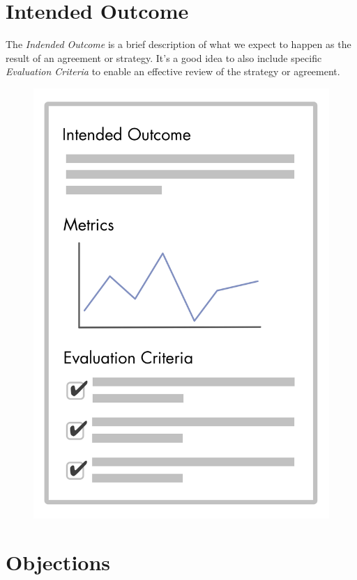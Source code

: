 \section{Intended Outcome}
\label{intendedoutcome}

The \emph{Indended Outcome} is a brief description of what we expect to happen as the result of an agreement or strategy. It's a good idea to also include specific \emph{Evaluation Criteria} to enable an effective review of the strategy or agreement.

\begin{figure}[htbp]
\centering
\includegraphics[keepaspectratio,width=\textwidth,height=0.75\textheight]{img/agreements/outcome-and-criteria.png}
\end{figure}

\section{Objections}
\label{objections}

